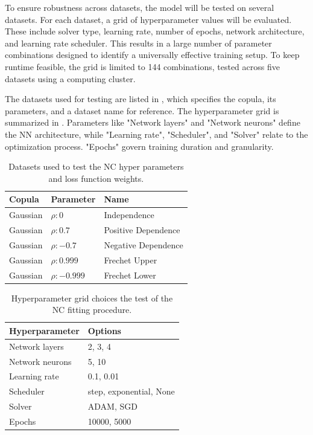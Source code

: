 To ensure robustness across datasets, the model will be tested on several datasets. For each dataset, a grid of hyperparameter values will be evaluated. These include solver type, learning rate, number of epochs, network architecture, and learning rate scheduler. This results in a large number of parameter combinations designed to identify a universally effective training setup. To keep runtime feasible, the grid is limited to 144 combinations, tested across five datasets using a computing cluster.

The datasets used for testing are listed in , which specifies the copula, its parameters, and a dataset name for reference. The hyperparameter grid is summarized in . Parameters like "Network layers" and "Network neurons" define the \gls{NN} architecture, while "Learning rate", "Scheduler", and "Solver" relate to the optimization process. "Epochs" govern training duration and granularity.

\begin{table}[h!]
    \centering
    \caption{Datasets used to test the \gls{NC} hyper parameters and loss function weights.}
    \begin{tabular}{lll}
    \textbf{Copula} & \textbf{Parameter} & \textbf{Name}  \\
    \hline
    Gaussian & $\rho:0$ & Independence \\
    Gaussian & $\rho:0.7$ & Positive Dependence \\
    Gaussian & $\rho:-0.7$ & Negative Dependence \\
    Gaussian & $\rho:0.999$ & Frechet Upper \\
    Gaussian & $\rho:-0.999$ & Frechet Lower \\
    \end{tabular}
    \label{tab:DatasetsTestedOn}
\end{table}

\begin{table}[h!]
    \centering
    \caption{Hyperparameter grid choices the test of the \gls{NC} fitting procedure.}
    \begin{tabular}{ll}
    \textbf{Hyperparameter} & \textbf{Options} \\
    \hline
    Network layers & 2, 3, 4 \\
    Network neurons & 5, 10 \\
    Learning rate & 0.1, 0.01 \\
    Scheduler & step, exponential, None \\
    Solver & ADAM, SGD \\
    Epochs & 10000, 5000 \\
    \end{tabular}
    \label{tab:se_hyperparams}
\end{table}

